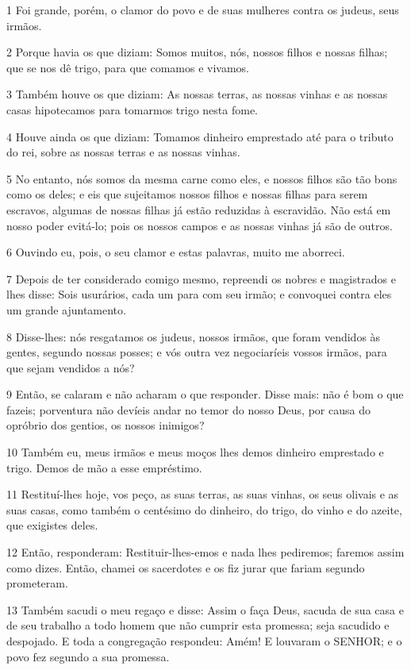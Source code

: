 \par 1 Foi grande, porém, o clamor do povo e de suas mulheres contra os judeus, seus irmãos.
\par 2 Porque havia os que diziam: Somos muitos, nós, nossos filhos e nossas filhas; que se nos dê trigo, para que comamos e vivamos.
\par 3 Também houve os que diziam: As nossas terras, as nossas vinhas e as nossas casas hipotecamos para tomarmos trigo nesta fome.
\par 4 Houve ainda os que diziam: Tomamos dinheiro emprestado até para o tributo do rei, sobre as nossas terras e as nossas vinhas.
\par 5 No entanto, nós somos da mesma carne como eles, e nossos filhos são tão bons como os deles; e eis que sujeitamos nossos filhos e nossas filhas para serem escravos, algumas de nossas filhas já estão reduzidas à escravidão. Não está em nosso poder evitá-lo; pois os nossos campos e as nossas vinhas já são de outros.
\par 6 Ouvindo eu, pois, o seu clamor e estas palavras, muito me aborreci.
\par 7 Depois de ter considerado comigo mesmo, repreendi os nobres e magistrados e lhes disse: Sois usurários, cada um para com seu irmão; e convoquei contra eles um grande ajuntamento.
\par 8 Disse-lhes: nós resgatamos os judeus, nossos irmãos, que foram vendidos às gentes, segundo nossas posses; e vós outra vez negociaríeis vossos irmãos, para que sejam vendidos a nós?
\par 9 Então, se calaram e não acharam o que responder. Disse mais: não é bom o que fazeis; porventura não devíeis andar no temor do nosso Deus, por causa do opróbrio dos gentios, os nossos inimigos?
\par 10 Também eu, meus irmãos e meus moços lhes demos dinheiro emprestado e trigo. Demos de mão a esse empréstimo.
\par 11 Restituí-lhes hoje, vos peço, as suas terras, as suas vinhas, os seus olivais e as suas casas, como também o centésimo do dinheiro, do trigo, do vinho e do azeite, que exigistes deles.
\par 12 Então, responderam: Restituir-lhes-emos e nada lhes pediremos; faremos assim como dizes. Então, chamei os sacerdotes e os fiz jurar que fariam segundo prometeram.
\par 13 Também sacudi o meu regaço e disse: Assim o faça Deus, sacuda de sua casa e de seu trabalho a todo homem que não cumprir esta promessa; seja sacudido e despojado. E toda a congregação respondeu: Amém! E louvaram o SENHOR; e o povo fez segundo a sua promessa.
